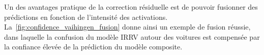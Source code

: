 Un des avantages pratique de la correction résiduelle est de pouvoir fusionner des prédictions en fonction de l'intensité des activations. La~\cref{fig:confidence_vaihingen_fusion} donne ainsi un exemple de fusion réussie, dans laquelle la confusion du modèle \gls{IRRV} autour des voitures est compensée par la confiance élevée de la prédiction du modèle composite. %

